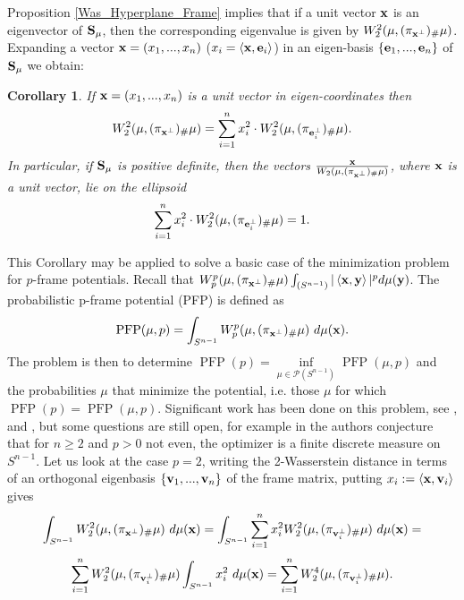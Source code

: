 \documentclass{amsart}
\numberwithin{equation}{section}
\newcommand\cP{{\mathcal P}}
\newcommand\PFP{{\operatorname{PFP}}}
\theoremstyle{plain}
\newtheorem{corollary}[subsection]{Corollary}
\theoremstyle{definition}
\begin{document}
Proposition \ref{Was_Hyperplane_Frame} implies that if a unit vector ${\bf x}$ is an eigenvector of ${\bf S_{\mu}}$, 
then the corresponding eigenvalue is given by $W^2_2(\mu, (\pi_{{\bf x}^{\perp}})_{\#}\mu)$. 
Expanding a vector ${\bf x}=(x_1, ..., x_n)$ ($x_i=\langle {\bf x}, {\bf e}_i\rangle$) in an eigen-basis $\{{\bf e}_1,..., {\bf e}_n\}$ of ${\bf S_{\mu}}$ we obtain: %
\begin{corollary}\label{decomposition}  If ${\bf x}=(x_1, ..., x_n)$ is a unit vector in eigen-coordinates then 
$$  W^2_2(\mu, (\pi_{{\bf x}^{\perp}})_{\#}\mu)=\sum^n_{i=1} x^2_i \cdot W^2_2(\mu, (\pi_{{\bf e}_i^{\perp}})_{\#}\mu).
$$
In particular, if ${\bf S_{\mu}}$ is positive definite, then the vectors $\frac{{\bf x}}{W_2(\mu, (\pi_{{\bf x}^{\perp}})_{\#}\mu)}$, where ${\bf x}$ is a unit vector, lie on the ellipsoid
$$\sum^n_{i=1} x^2_i \cdot W^2_2(\mu, (\pi_{{\bf e}_i^{\perp}})_{\#}\mu)=1.
$$ 
\end{corollary} 
This Corollary may be applied to solve a basic case of the minimization problem for $p$-frame potentials. 
Recall that $W^p_p(\mu, (\pi_{{\bf x}^{\perp}})_{\#}\mu) \int_{(S^{n-1})}  \vert \left\langle {\bf x},{\bf y} \right\rangle \vert^p d\mu({\bf y})$. 
The probabilistic p-frame potential (PFP) is defined as 
\begin{equation*}
  \PFP(\mu,p)=  \int_{S^{n-1}} W^p_p(\mu, (\pi_{{\bf x}^{\perp}})_{\#}\mu) \ d\mu({\bf x}).  
\end{equation*}
The problem is then to determine $\PFP(p)=\underset{\mu \in \cP(S^{n-1})}{\inf}\PFP(\mu,p)$ and the probabilities $\mu$ that minimize the potential, i.e. those $\mu$ for which $\PFP(p)=\PFP(\mu,p)$.
Significant work has been done on this problem, see \cite{ehler2012minimization}, \cite{wickman2023gradient} and \cite{bilyk2022optimal}, 
but some questions are still open, for example in \cite{bilyk2022optimal} the authors conjecture that for $n \geq 2$ and $p>0$ not even, the optimizer is a finite discrete measure on $S^{n-1}$.  
Let us look at the case $p=2$, writing the 2-Wasserstein distance in terms of an orthogonal eigenbasis $\{{\bf v}_1,...,{\bf v}_n\}$ 
of the frame matrix, putting $x_i:=\langle {\bf x}, {\bf v}_i\rangle$ gives
\[ \int_{S^{n-1}} W^2_2(\mu, (\pi_{{\bf x}^{\perp}})_{\#}\mu) \ d\mu({\bf x})= \int_{S^{n-1}} \sum^n_{i=1}x_i^2 W^2_2(\mu, (\pi_{{\bf v}^{\perp}_i})_{\#}\mu) \ d\mu({\bf x})=\]
\[ \sum^n_{i=1} W^2_2(\mu, (\pi_{{\bf v}^{\perp}_i})_{\#}\mu) \int_{S^{n-1}} x_i^2 \ d\mu({\bf x})  = \sum^n_{i=1} W^4_2(\mu, (\pi_{{\bf v}^{\perp}_i})_{\#}\mu).
\]
\end{document}
